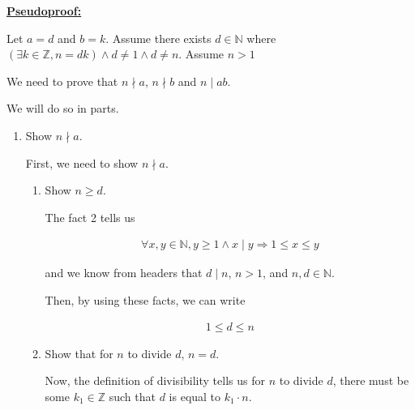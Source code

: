 \documentclass[12pt]{article}
\begin{document}
\begin{enumerate}[a.]
    \begin{mdframed}

    \underline{\textbf{Pseudoproof:}}

    \bigskip

    Let $a = d$ and $b = k$. Assume there exists $d \in \mathbb{N}$ where
    $(\exists k \in \mathbb{Z}, n = dk) \land d \neq 1 \land d \neq n$. Assume $n > 1$

    \bigskip

    We need to prove that $n \nmid a$, $n \nmid b$ and $n \mid ab$.

    \bigskip

    We will do so in parts.

    \bigskip

    \begin{enumerate}[1.]
        \item Show $n \nmid a$.

        \bigskip

        First, we need to show $n \nmid a$.

        \bigskip

        \begin{enumerate}[1.]

            \item Show $n \geq d$.

            \bigskip

            \begin{mdframed}
            The fact 2 tells us

            \begin{align}
                \forall x,y \in \mathbb{N}, y \geq 1 \land x \mid y \Rightarrow 1 \leq x \leq y
            \end{align}

            and we know from headers that $d \mid n$, $n > 1$, and $n,d \in \mathbb{N}$.

            \bigskip

            Then, by using these facts, we can write

            \begin{align}
                1 \leq d \leq n
            \end{align}

            \end{mdframed}

            \item Show that for $n$ to divide $d$, $n = d$.

            \begin{mdframed}
            Now, the definition of divisibility tells us for $n$ to
            divide $d$, there must be some $k_1 \in \mathbb{Z}$ such that
            $d$ is equal to $k_1 \cdot n$.


\end{mdframed}
\end{enumerate}
\end{enumerate}
\end{mdframed}
\end{enumerate}
\end{document}
